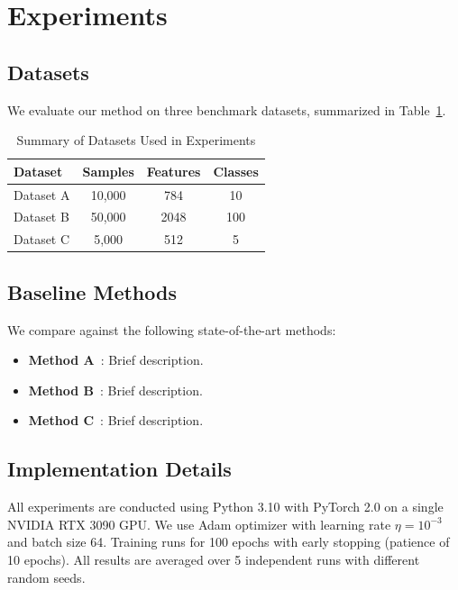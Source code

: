 \documentclass[conference,10pt]{IEEEtran}
\begin{document}
\section{Experiments}
\label{sec:experiments}

\subsection{Datasets}
\label{subsec:datasets}
We evaluate our method on three benchmark datasets, summarized in
Table~\ref{tab:datasets}.

\begin{table}[t]
    \centering
    \caption{Summary of Datasets Used in Experiments}
    \label{tab:datasets}
    \begin{tabular}{lccc}
        \toprule
        \textbf{Dataset} & \textbf{Samples} & \textbf{Features} & \textbf{Classes} \\
        \midrule
        Dataset A & 10{,}000 & 784  & 10 \\
        Dataset B & 50{,}000 & 2048 & 100 \\
        Dataset C & 5{,}000  & 512  & 5 \\
        \bottomrule
    \end{tabular}
\end{table}

\subsection{Baseline Methods}
We compare against the following state-of-the-art methods:
\begin{itemize}
    \item \textbf{Method A}~\cite{ref_baseline_1}: Brief description.
    \item \textbf{Method B}~\cite{ref_baseline_2}: Brief description.
    \item \textbf{Method C}~\cite{ref_baseline_3}: Brief description.
\end{itemize}

\subsection{Implementation Details}
\label{subsec:implementation}
All experiments are conducted using Python 3.10 with PyTorch 2.0 on a
single NVIDIA RTX 3090 GPU. We use Adam optimizer with learning rate
$\eta = 10^{-3}$ and batch size 64. Training runs for 100 epochs with
early stopping (patience of 10 epochs). All results are averaged over
5 independent runs with different random seeds.
\end{document}
